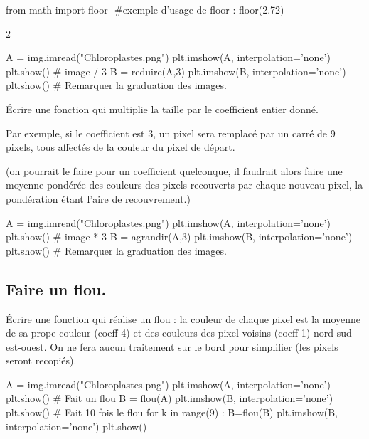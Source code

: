 \documentclass[french,11pt,twoside]{VcCours}
\begin{document}
\begin{PY}
from math import floor
​
#exemple d'usage de floor :
floor(2.72)
\end{PY}
\begin{PYout}
2
\end{PYout}

\begin{PY}
A = img.imread("Chloroplastes.png")
plt.imshow(A, interpolation='none')
plt.show()
# image / 3
B = reduire(A,3)
plt.imshow(B, interpolation='none')
plt.show()
# Remarquer la graduation des images.
\end{PY}


\begin{Exercice}
Écrire une fonction  qui multiplie la taille par le coefficient entier donné.

Par exemple, si le coefficient est 3, un pixel sera remplacé par un carré de 9
pixels, tous affectés de la couleur du pixel de départ.

 (on pourrait le faire pour un coefficient quelconque, il faudrait alors faire une moyenne pondérée des couleurs des pixels recouverts par chaque nouveau pixel, la pondération étant l'aire de recouvrement.)
\end{Exercice}

\begin{PY}
A = img.imread("Chloroplastes.png")
plt.imshow(A, interpolation='none')
plt.show()
# image * 3
B = agrandir(A,3)
plt.imshow(B, interpolation='none')
plt.show()
# Remarquer la graduation des images.
\end{PY}

\subsection{Faire un flou.}
\begin{Exercice}
Écrire une fonction  qui réalise un flou : 
la couleur de chaque pixel est la moyenne de sa prope couleur (coeff 4)
et des couleurs des pixel voisins (coeff 1) nord-sud-est-ouest. 
On ne fera aucun traitement sur le bord pour simplifier (les pixels 
seront recopiés).
\end{Exercice}

\begin{PY}
A = img.imread("Chloroplastes.png")
plt.imshow(A, interpolation='none')
plt.show()
# Fait un flou
B = flou(A)
plt.imshow(B, interpolation='none')
plt.show()
# Fait 10 fois le flou
for k in range(9) :
    B=flou(B)
plt.imshow(B, interpolation='none')
plt.show()
\end{PY}
\end{document}
